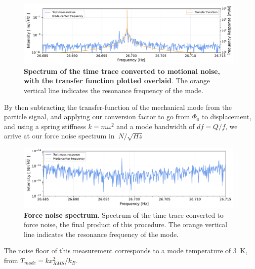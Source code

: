 \begin{appendices}
\begin{figure}[ht]
\centering
\includegraphics[width=\textwidth]{Appenidx/paper_transferfunction_and_motion.pdf}%
\caption{\textbf{Spectrum of the time trace converted to motional noise, with the transfer function plotted overlaid}. The orange vertical line indicates the resonance frequency of the mode.}%
\end{figure}

By then subtracting the transfer-function of the mechanical mode from the particle signal, and applying our conversion factor to go from $\Phi_0$ to displacement, and using a spring stiffness $k = m\omega^2$ and a mode bandwidth of $df=Q/f$, we arrive at our force noise spectrum in $\SI{}{N/\sqrt{Hz}}$

\begin{figure}[ht]%
\centering
\includegraphics[width=\textwidth]{Appenidx/paper_spectrum_force.pdf}%
\caption{\textbf{Force noise spectrum}. Spectrum of the time trace converted to force noise, the final product of this procedure. The orange vertical line indicates the resonance frequency of the mode.}%
\end{figure}

The noise floor of this measurement corresponds to a mode temperature of \SI{3}{K}, from $T_{mode} = kx_{RMS}^2/k_B$.

\end{appendices}
